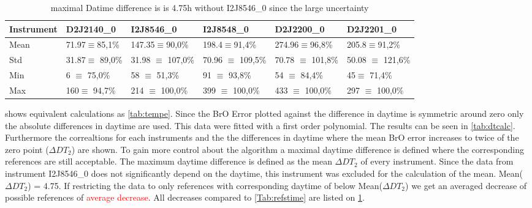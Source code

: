 \documentclass  [
  paper    = a4,
  BCOR     = 10mm,
  twoside,
  fontsize = 12pt,
  fleqn,
  toc      = bibnumbered,
  toc      = listofnumbered,
  numbers  = noendperiod,
  headings = normal,
  listof   = leveldown,
  version  = 3.03
]                                       {scrreprt}
\begin{document}
	\begin{table}
	\begin{tabular}{|p{2cm}|p{2cm}|p{2cm}|p{2cm}|p{2cm}|p{2cm}|}
		Instrument	&D2J2140\_0&I2J8546\_0& I2J8548\_0&D2J2200\_0&D2J2201\_0\\
		\toprule
		Mean&
		71.97$\equiv$85,1\% &		147.35$\equiv$90,0\%&
		198.4$\equiv$91,4\%&		274.96$\equiv$96,8\%&
		205.8$\equiv$91,2\%\\
		\midrule
		Std&		31.87$\equiv$	89,0\%&31.98 $\equiv$	107,0\%&
		70.96 $\equiv$	109,5\%&		70.78 $\equiv$	101,8\%&
		50.08 $\equiv$	121,6\% \\
		\midrule
		Min&
		6 $\equiv$	75,0\%&		58 $\equiv$	51,3\%
		&91 $\equiv$	93,8\%		&54  $\equiv$	84,4\%
		&45$\equiv$	71,4\%\\
		\midrule
		Max&
		160$\equiv$	94,7\% &
		214 $\equiv$	100,0\% &
		399 $\equiv$	100,0\% &
		433  $\equiv$	100,0\% &
		297 $\equiv$	100,0\% \\
		\bottomrule
	\end{tabular}
	\caption{maximal Datime difference is  is 4.75h without I2J8546\_0 since the large uncertainty}
	\label{tab:daytimerest}
\end{table}	

 shows equivalent calculations as \cref{tab:tempe}. Since the BrO Error plotted against the difference in daytime is symmetric around zero only the absolute differences in daytime are used. This data were fitted with a first order polynomial. The results can be seen in \cref{tab:dtcalc}. Furthermore the correaltions for each instruments and the the differences in daytime where the mean BrO error increases to twice of the zero point ($\Delta DT_{2}$) are shown. To gain more control about the algorithm a maximal daytime difference is defined where the corresponding references are still acceptable. The maximum daytime difference is defined as the mean $\Delta DT_{2}$ of every instrument. Since the data from instrument I2J8546\_0 does not significantly depend on the daytime, this instrument was excluded for the calculation of the mean. Mean($\Delta DT_{2}$) = 4.75. If restricting the data to only references with corresponding daytime of below Mean($\Delta DT_{2}$) we get an averaged decrease of possible references of \textcolor{red}{average decrease}. All decreases compared to \cref{Tab:refstime} are listed on \cref{tab:daytimerest}.
\end{document}
